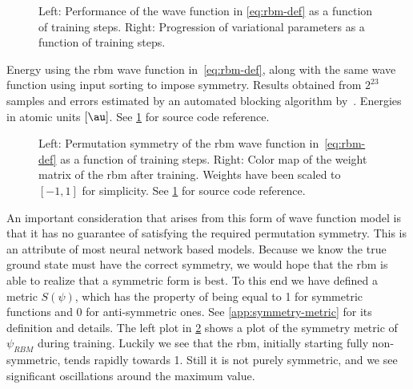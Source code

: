 \documentclass[Thesis.tex]{subfiles}
\begin{document}
\begin{figure}[h]
   \centering
    \resizebox{\linewidth}{!}{%
        
    }
    \caption[Learning progression of an \gls{rbm} on quantum dots]{\label{fig:QD-rbm-training}Left: Performance of the
      wave function in \cref{eq:rbm-def} as a function of
      training steps. Right: Progression of variational parameters as a function
      of training steps.}
\end{figure}

\begin{table}[h]
  \centering
  \caption[Energy estimates using an \gls{rbm} on quantum dots]{Energy using the \gls{rbm} wave function in~\cref{eq:rbm-def}, along with
the same wave function using input sorting to impose symmetry. Results obtained
from $2^{23}$ samples and errors estimated by an automated blocking
algorithm by~\textcite{Jonsson-2018}. Energies in atomic units $[\si{\au}]$. See
\cref{fig:QD-rbm-training} for source code reference.}
  
  \label{tab:rbm-energy-results}
\end{table}

\begin{figure}[h]
   \centering
    \resizebox{\linewidth}{!}{%
        
    }
    \caption[Symmetry and weight matrix of an \gls{rbm} used on quantum dots]{\label{fig:QD-rbm-symmetry}Left: Permutation symmetry of the \gls{rbm} wave
function in~\cref{eq:rbm-def} as a function of training steps. Right: Color map
of the weight matrix of the \gls{rbm} after training. Weights have been scaled to
$[-1, 1]$ for simplicity. See \cref{fig:QD-rbm-training} for source code reference.}
\end{figure}

An important consideration that arises from this form of wave function model
is that it has no guarantee of satisfying the required permutation symmetry.
This is an attribute of most neural network based models. Because we know the
true ground state must have the correct symmetry, we would hope that the \gls{rbm} is
able to realize that a symmetric form is best. To this end we have defined a
metric $S(\psi)$, which has the property of being equal to 1 for symmetric
functions and $0$ for anti-symmetric ones. See \cref{app:symmetry-metric} for
its definition and details. The left plot in \cref{fig:QD-rbm-symmetry} shows a
plot of the symmetry metric of $\psi_{RBM}$ during training. Luckily we see
that the \gls{rbm}, initially starting fully non-symmetric, tends rapidly towards
1. Still it is not purely symmetric, and we see significant
oscillations around the maximum value.
\end{document}
